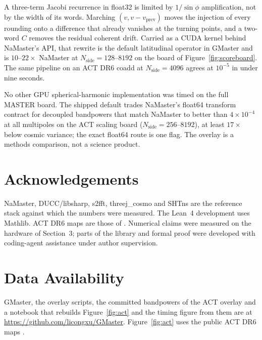 \documentclass[letters,usenatbib,useAMS]{mnras}
\begin{document}
A three-term Jacobi recurrence in float32 is limited by $1/\sin\phi$ amplification, not by the width of its words. Marching $(v,v-v_{\mathrm{prev}})$ moves the injection of every rounding onto a difference that already vanishes at the turning points, and a two-word $C$ removes the residual coherent drift. Carried as a CUDA kernel behind NaMaster's API, that rewrite is the default latitudinal operator in GMaster and is $10$--$22\times$ NaMaster at $N_{\mathrm{side}}=128$--$8192$ on the board of Figure~\ref{fig:scoreboard}. The same pipeline on an ACT DR6 coadd at $N_{\mathrm{side}}=4096$ agrees at $10^{-5}$ in under nine seconds.

No other GPU spherical-harmonic implementation was timed on the full MASTER board. The shipped default trades NaMaster's float64 transform contract for decoupled bandpowers that match NaMaster to better than $4\times10^{-4}$ at all multipoles on the ACT scaling board ($N_{\mathrm{side}}=256$--$8192$), at least $17\times$ below cosmic variance; the exact float64 route is one flag. The overlay is a methods comparison, not a science product.

\section*{Acknowledgements}

NaMaster, DUCC/libsharp, s2fft, threej\_cosmo and SHTns are the reference stack against which the numbers were measured. The Lean~4 development uses Mathlib. ACT DR6 maps are those of \citet{naess2025}. Numerical claims were measured on the hardware of Section~3; parts of the library and formal proof were developed with coding-agent assistance under author supervision.

\section*{Data Availability}

GMaster, the overlay scripts, the committed bandpowers of the ACT overlay and a notebook that rebuilds Figure~\ref{fig:act} and the timing figure from them are at \url{https://github.com/licongxu/GMaster}. Figure~\ref{fig:act} uses the public ACT DR6 maps \citep{naess2025}.

\begingroup
\setlength{\bibsep}{0pt}
\small


\endgroup

\bsp
\label{lastpage}
\end{document}
